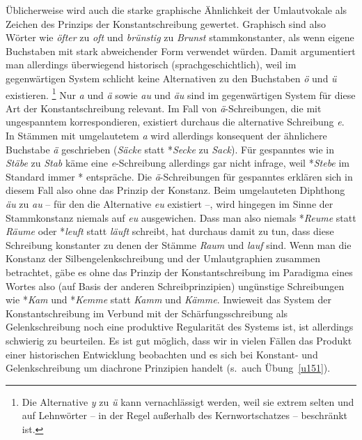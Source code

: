 Üblicherweise wird auch die starke graphische Ähnlichkeit der Umlautvokale als Zeichen des Prinzips der Konstantschreibung gewertet.
Graphisch sind also Wörter wie \textit{öfter} zu \textit{oft} und \textit{brünstig} zu \textit{Brunst} stammkonstanter, als wenn eigene Buchstaben mit stark abweichender Form verwendet würden.
Damit argumentiert man allerdings überwiegend historisch (sprachgeschichtlich), weil im gegenwärtigen System schlicht keine Alternativen zu den Buchstaben \textit{ö} und \textit{ü} existieren.%
\footnote{Die Alternative \textit{y} zu \textit{ü} kann vernachlässigt werden, weil sie extrem selten und auf Lehnwörter -- in der Regel außerhalb des Kernwortschatzes -- beschränkt ist.}
Nur \textit{a} und \textit{ä} sowie \textit{au} und \textit{äu} sind im gegenwärtigen System für diese Art der Konstantschreibung relevant.
Im Fall von \textit{ä}-Schreibungen, die mit ungespanntem \textipa{[E]} korrespondieren, existiert durchaus die alternative Schreibung \textit{e}.
In Stämmen mit umgelautetem \textit{a} wird allerdings konsequent der ähnlichere Buchstabe \textit{ä} geschrieben (\textit{Säcke} statt *\textit{Secke} zu \textit{Sack}).
Für gespanntes \textipa{[E:]} wie in \textit{Stäbe} \textipa{[StE:b@]} zu \textit{Stab} \textipa{[Sta:p]} käme eine \textit{e}-Schreibung allerdings gar nicht infrage, weil *\textit{Stebe} im Standard immer *\textipa{[Ste:b@]} entspräche.
Die \textit{ä}-Schreibungen für gespanntes \textipa{[E:]} erklären sich in diesem Fall also ohne das Prinzip der Konstanz.
Beim umgelauteten Diphthong \textit{äu} \textipa{[\t{O\oe}]} zu \textit{au} -- für den die Alternative \textit{eu} existiert --, wird hingegen im Sinne der Stammkonstanz niemals auf \textit{eu} ausgewichen.
Dass man also niemals *\textit{Reume} statt \textit{Räume} oder *\textit{leuft} statt \textit{läuft} schreibt, hat durchaus damit zu tun, dass diese Schreibung konstanter zu denen der Stämme \textit{Raum} und \textit{lauf} sind.
Wenn man die Konstanz der Silbengelenkschreibung und der Umlautgraphien zusammen betrachtet, gäbe es ohne das Prinzip der Konstantschreibung im Paradigma eines Wortes also (auf Basis der anderen Schreibprinzipien) ungünstige Schreibungen wie *\textit{Kam} und *\textit{Kemme} statt \textit{Kamm} und \textit{Kämme}.
Inwieweit das System der Konstantschreibung im Verbund mit der Schärfungsschreibung als Gelenkschreibung noch eine produktive Regularität des Systems ist, ist allerdings schwierig zu beurteilen.
Es ist gut möglich, dass wir in vielen Fällen das Produkt einer historischen Entwicklung beobachten und es sich bei Konstant- und Gelenkschreibung um diachrone Prinzipien handelt (s.\ auch Übung~\ref{u151}).

